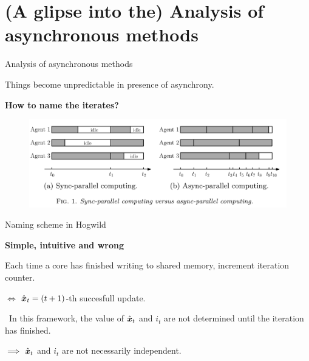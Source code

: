 \documentclass[10pt]{beamer}
\begin{document}
\section{(A glipse into the) Analysis of asynchronous methods}

\begin{frame}{Analysis of asynchronous methods}

Things become unpredictable in presence of asynchrony.


{\bfseries How to name the iterates?}

\begin{figure}
\vspace{-0.5em}\includegraphics[width=0.8\linewidth]{img/sync_vs_async}
\vspace{-0.5em}\end{figure}

\end{frame}



\begin{frame}{Naming scheme in Hogwild}

{\bfseries Simple, intuitive and wrong}

Each time a core has finished writing to shared memory, increment iteration counter.

$\iff$ $\hat{{\boldsymbol x}}_t = (t+1)$-th succesfull update.

\vspace{1em}\faWarning~In this framework, the value of $\hat{{\boldsymbol x}}_t$ and $i_t$ are not determined until the iteration has finished.

$\implies$ $\hat{{\boldsymbol x}}_t$ and $i_t$  are not necessarily independent.

\end{frame}
\end{document}
